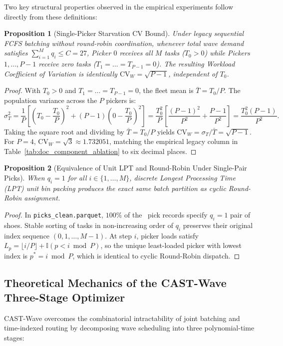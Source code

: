 \documentclass[11pt,a4paper]{article}
\newtheorem{proposition}{Proposition}
\begin{document}
Two key structural properties observed in the empirical experiments follow directly from these definitions:

\begin{proposition}[Single-Picker Starvation CV Bound]
Under legacy sequential FCFS batching without round-robin coordination, whenever total wave demand satisfies $\sum_{i=1}^M q_i \le C = 27$, Picker $0$ receives all $M$ tasks ($T_0 > 0$) while Pickers $1, \dots, P-1$ receive zero tasks ($T_1 = \dots = T_{P-1} = 0$). The resulting Workload Coefficient of Variation is identically $\text{CV}_W = \sqrt{P - 1}$, independent of $T_0$.
\end{proposition}
\begin{proof}
With $T_0 > 0$ and $T_1 = \dots = T_{P-1} = 0$, the fleet mean is $\bar{T} = T_0 / P$. The population variance across the $P$ pickers is:
\begin{equation}
    \sigma_T^2 = \frac{1}{P}\left[ \left(T_0 - \frac{T_0}{P}\right)^2 + (P - 1)\left(0 - \frac{T_0}{P}\right)^2 \right] = \frac{T_0^2}{P}\left[ \frac{(P-1)^2}{P^2} + \frac{P-1}{P^2} \right] = \frac{T_0^2 (P - 1)}{P^2}.
\end{equation}
Taking the square root and dividing by $\bar{T} = T_0 / P$ yields $\text{CV}_W = \sigma_T / \bar{T} = \sqrt{P - 1}$. For $P = 4$, $\text{CV}_W = \sqrt{3} \approx 1.732051$, matching the empirical legacy column in Table~\ref{tab:doc_component_ablation} to six decimal places.
\end{proof}

\begin{proposition}[Equivalence of Unit LPT and Round-Robin Under Single-Pair Picks]
When $q_i = 1$ for all $i \in \{1, \dots, M\}$, discrete Longest Processing Time (LPT) unit bin packing produces the exact same batch partition as cyclic Round-Robin assignment.
\end{proposition}
\begin{proof}
In \texttt{picks\_clean.parquet}, $100\%$ of the \TotalPicks~pick records specify $q_i = 1$ pair of shoes. Stable sorting of tasks in non-increasing order of $q_i$ preserves their original index sequence $(0, 1, \dots, M-1)$. At step $i$, picker loads satisfy $L_p = \lfloor i / P \rfloor + \mathbb{I}(p < i \bmod P)$, so the unique least-loaded picker with lowest index is $p^* = i \bmod P$, which is identical to cyclic Round-Robin dispatch.
\end{proof}

\subsection{Theoretical Mechanics of the CAST-Wave Three-Stage Optimizer}
CAST-Wave overcomes the combinatorial intractability of joint batching and time-indexed routing by decomposing wave scheduling into three polynomial-time stages:
\end{document}
